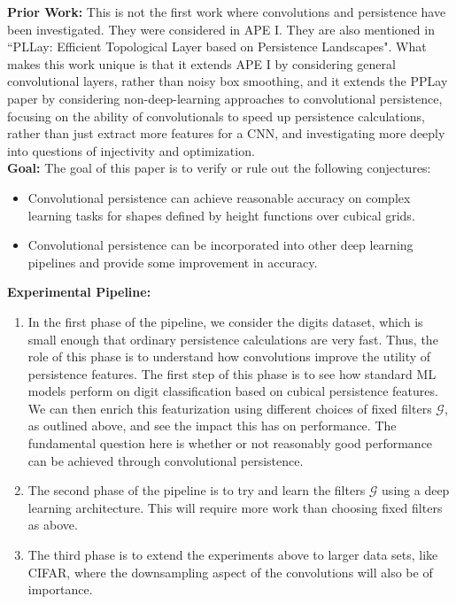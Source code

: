 \documentclass[conference]{IEEEtran}
\theoremstyle{definition}
\numberwithin{figure}{section}
\begin{document}
  
{\bf Prior Work:} This is not the first work where convolutions and persistence have been investigated. They were considered in APE I. They are also mentioned in ``PLLay: Efficient Topological Layer based on Persistence Landscapes". What makes this work unique is that it extends APE I by considering general convolutional layers, rather than noisy box smoothing, and it extends the PPLay paper by considering non-deep-learning approaches to convolutional persistence, focusing on the ability of convolutionals to speed up persistence calculations, rather than just extract more features for a CNN, and investigating more deeply into questions of injectivity and optimization.\\

{\bf Goal:} The goal of this paper is to verify or rule out the following conjectures: 
\begin{itemize}
	\item Convolutional persistence can achieve reasonable accuracy on complex learning tasks for shapes defined by height functions over cubical grids.
	\item Convolutional persistence can be incorporated into other deep learning pipelines and provide some improvement in accuracy.
\end{itemize}


{\bf Experimental Pipeline:}
\begin{enumerate}
	\item In the first phase of the pipeline, we consider the digits dataset, which is small enough that ordinary persistence calculations are very fast. Thus, the role of this phase is to understand how convolutions improve the utility of persistence features. The first step of this phase is to see how standard ML models perform on digit classification based on cubical persistence features. We can then enrich this featurization using different choices of fixed filters $\mathcal{G}$, as outlined above, and see the impact this has on performance. The fundamental question here is whether or not reasonably good performance can be achieved through convolutional persistence. 
	\item The second phase of the pipeline is to try and learn the filters $\mathcal{G}$ using a deep learning architecture. This will require more work than choosing fixed filters as above.
	\item The third phase is to extend the experiments above to larger data sets, like CIFAR, where the downsampling aspect of the convolutions will also be of importance.
\end{enumerate}
\end{document}
